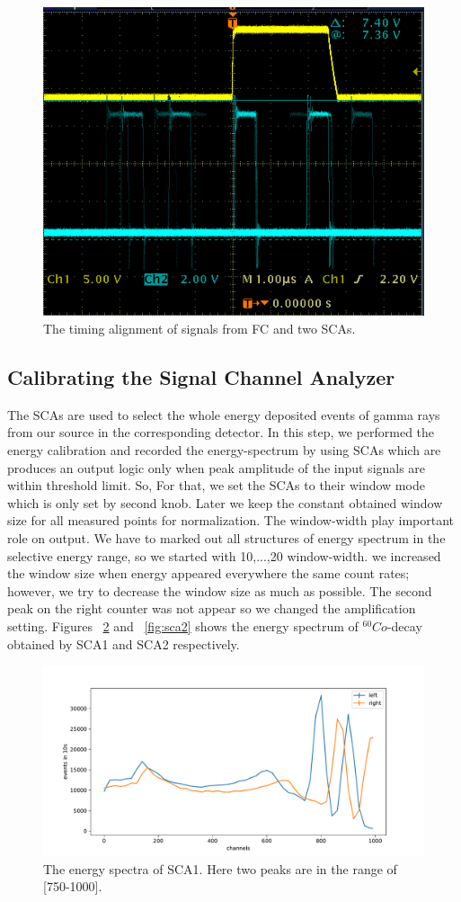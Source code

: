 \begin{figure}[ht]
	\centering
	\includegraphics[width=0.8\linewidth]{./figs/slow.png}
	\caption{The timing alignment of signals from FC and two SCAs.}%
	\label{fig:slow}
\end{figure}


\subsection{Calibrating the Signal Channel Analyzer}
The SCAs are used to select the whole energy deposited events of gamma rays from our source in the corresponding detector. 
In this step, we performed the energy calibration and recorded the energy-spectrum by using SCAs which are produces an output logic only when peak amplitude of the input signals are within threshold limit. So, For that, we set the SCAs to their window mode which is only set by second knob. Later we keep the constant obtained window size for all measured points for normalization. The window-width play important role on output. We have to  marked out all structures of energy spectrum in the selective energy range, so we started with 10,...,20 window-width. we increased the window size when energy appeared everywhere the same count rates; however, we try to decrease the window size as much as possible. The second peak on the right counter was not appear so we changed the amplification setting. Figures ~\ref{fig:sca1} and ~\ref{fig:sca2} shows the energy spectrum of $ ^{60}Co$-decay obtained by SCA1 and SCA2 respectively.


\begin{figure}[ht]
	\centering
	\includegraphics[width=0.8\linewidth]{./figs/sca.pdf}
	\caption{The energy spectra of SCA1. Here two peaks are in the range of [750-1000].}%
	\label{fig:sca1}
\end{figure}

